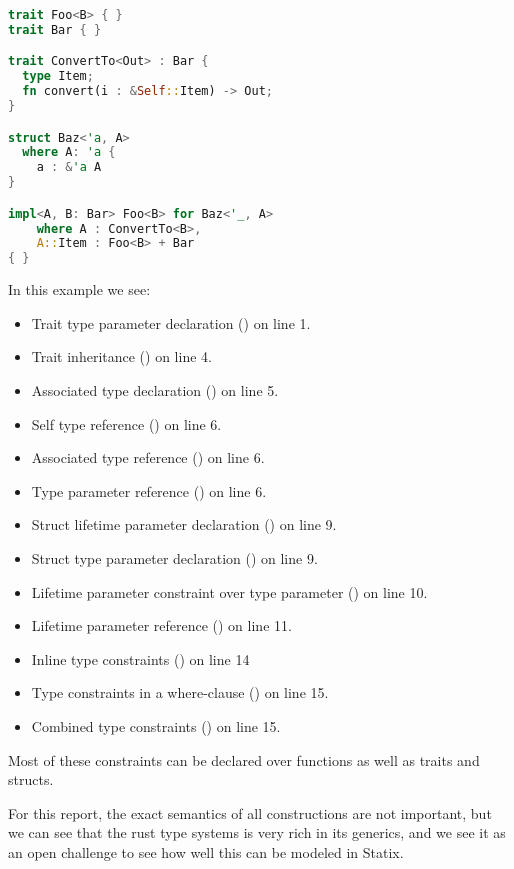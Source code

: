 \begin{lstlisting}[language=rust, showstringspaces=false, escapechar=~, label={lst:param_constraints}, caption={Example of complex parametric constraints}]
trait Foo<B> { }
trait Bar { }

trait ConvertTo<Out> : Bar {
  type Item;
  fn convert(i : &Self::Item) -> Out;
}

struct Baz<'a, A> 
  where A: 'a {
    a : &'a A
}

impl<A, B: Bar> Foo<B> for Baz<'_, A> 
    where A : ConvertTo<B>,
    A::Item : Foo<B> + Bar
{ }
\end{lstlisting}

In this example we see:
\begin{itemize}
    \item Trait type parameter declaration () on line 1.
    \item Trait inheritance () on line 4.
    \item Associated type declaration () on line 5.
    \item Self type reference () on line 6.
    \item Associated type reference () on line 6.
    \item Type parameter reference () on line 6.
    \item Struct lifetime parameter declaration () on line 9.
    \item Struct type parameter declaration () on line 9.
    \item Lifetime parameter constraint over type parameter () on line 10.
    \item Lifetime parameter reference () on line 11.
    \item Inline type constraints () on line 14
    \item Type constraints in a where-clause () on line 15.
    \item Combined type constraints () on line 15.
\end{itemize}

Most of these constraints can be declared over functions as well as traits and structs.

For this report, the exact semantics of all constructions are not important, but we can see that the rust type systems is very rich in its generics, and we see it as an open challenge to see how well this can be modeled in Statix.

